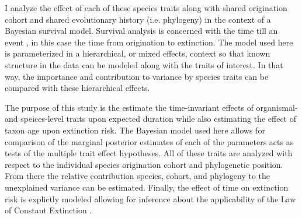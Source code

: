 \documentclass[12pt,letterpaper]{article}
\begin{document}
I analyze the effect of each of these species traits along with shared origination cohort and shared evolutionary history (i.e. phylogeny) in the context of a Bayesian survival model. Survival analysis is concerned with the time till an event \citep{Klein2003}, in this case the time from origination to extinction. The model used here is parameterized in a hierarchical, or mixed effects, context so that known structure in the data can be modeled along with the traits of interest. In that way, the importance and contribution to variance by species traits can be compared with these hierarchical effects.

The purpose of this study is the estimate the time-invariant effects of organismal- and speices-level traits upon expected duration while also estimating the effect of taxon age upon extinction risk. The Bayesian model used here allows for comparison of the marginal posterior estimates of each of the parameters acts as tests of the multiple trait effect hypotheses. All of these traits are analyzed with respect to the individual species origination cohort and phylogenetic position. From there the relative contribution species, cohort, and phylogeny to the unexplained variance can be estimated. Finally, the effect of time on extinction risk is explictly modeled allowing for inference about the applicability of the Law of Constant Extinction \citep{VanValen1973}.
\end{document}
